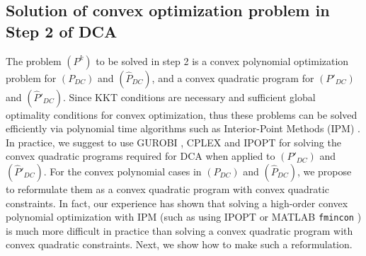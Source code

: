 \documentclass[3p]{elsarticle}
\begin{document}
\begin{table}[ht!]
	\caption{Step 2 of DCA for $(\hat{P}_{DC})$, $(P'_{DC})$ and $(\hat{P}'_{DC})$}
	\label{tab:diffofdcas}
	\begin{center}
	\end{center}
\end{table}
\subsection{Solution of convex optimization problem in Step 2 of DCA} \label{subsec:socpformulation}
The problem $(P^k)$ to be solved in step 2 is a convex polynomial optimization problem for $(P_{DC})$ and $(\hat{P}_{DC})$, and a convex quadratic program for $(P'_{DC})$ and $(\hat{P}'_{DC})$. Since KKT conditions are necessary and sufficient global optimality conditions for convex optimization, thus these problems can be solved efficiently via polynomial time algorithms such as Interior-Point Methods (IPM) \cite{Boyd}. In practice, we suggest to use GUROBI \cite{Gurobi}, CPLEX \cite{Cplex} and IPOPT \cite{Ipopt} for solving the convex quadratic programs required for DCA when applied to $(P'_{DC})$ and $(\hat{P}'_{DC})$. For the convex polynomial cases in $(P_{DC})$ and $(\hat{P}_{DC})$, we propose to reformulate them as a convex quadratic program with convex quadratic constraints. In fact, our experience has shown that solving a high-order convex polynomial optimization with IPM (such as using IPOPT \cite{Ipopt} or MATLAB \verb|fmincon| \cite{Matlab}) is much more difficult in practice than solving a convex quadratic program with convex quadratic constraints. Next, we show how to make such a reformulation.
\end{document}
